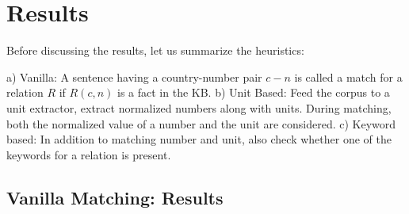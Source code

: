 \documentclass[a4paper,10pt]{article}
\begin{document}
\section{Results}

Before discussing the results, let us summarize the heuristics:

a) Vanilla: A sentence having a country-number pair $c-n$ is called a match for a relation $R$ if $R(c,n)$ is a fact in the KB.
b) Unit Based: Feed the corpus to a unit extractor, extract normalized numbers along with units. During matching, both the normalized value of a number
and the unit are considered.
c) Keyword based: In addition to matching number and unit, also check whether one of the keywords for a relation is present. 

\subsection{Vanilla Matching: Results}
\begin{center}
\end{center}
\end{document}
